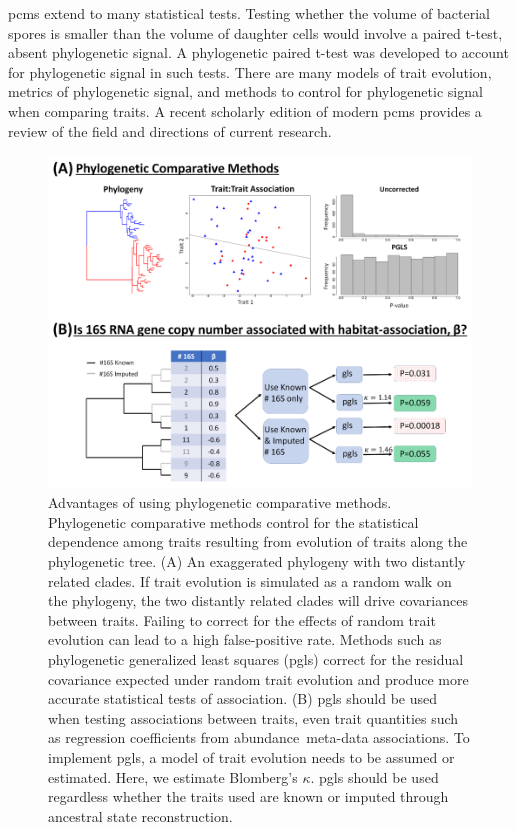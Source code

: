 \gls{pcm}s extend to many statistical tests. Testing whether the volume of bacterial spores is smaller than the volume of daughter cells would involve a paired t-test, absent phylogenetic signal. A phylogenetic paired t-test\cite{lindenfors_test} was developed to account for phylogenetic signal in such tests. There are many models of trait evolution, metrics of phylogenetic signal, and methods to control for phylogenetic signal when comparing traits. A recent scholarly edition of modern \gls{pcm}s provides a review of the field and directions of current research\cite{pgls}.\par
\begin{figure}[H]
        \centering
        \includegraphics[width=1\textwidth]{ch1/figure1.png}
        \caption[Advantages of using phylogenetic comparative methods.]
        {Advantages of using phylogenetic comparative methods. Phylogenetic comparative methods control for the statistical dependence among traits resulting from evolution of traits along the phylogenetic tree. (A) An exaggerated phylogeny with two distantly related clades. If trait evolution is simulated as a random walk on the phylogeny, the two distantly related clades will drive covariances between traits. Failing to correct for the effects of random trait evolution can lead to a high false-positive rate. Methods such as phylogenetic generalized least squares (\gls{pgls}) correct for the residual covariance expected under random trait evolution and produce more accurate statistical tests of association. (B) \gls{pgls} should be used when testing associations between traits, even trait quantities such as regression coefficients from abundance~meta-data associations. To implement \gls{pgls}, a model of trait evolution needs to be assumed or estimated. Here, we estimate Blomberg's $\kappa$. \gls{pgls} should be used regardless whether the traits used are known or imputed through ancestral state reconstruction.}
        \label{fig1a}
\end{figure}

